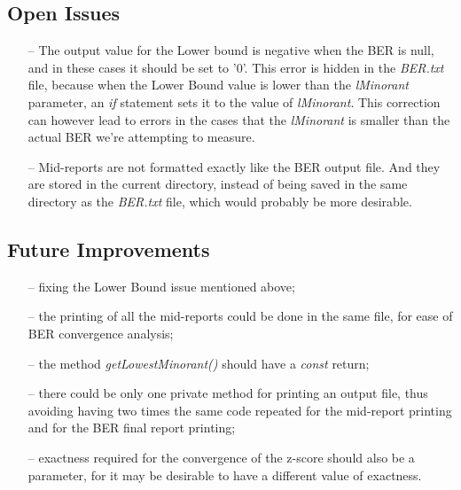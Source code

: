 \begin{refsection}
\subsection*{Open Issues}
\begin{itemize}
  \item[--] The output value for the Lower bound is negative when the BER is null, and in these cases it should be set to '0'. This error is hidden in the \textit{BER.txt} file, because when the Lower Bound value is lower than the \textit{lMinorant} parameter, an \textit{if} statement sets it to the value of \textit{lMinorant}. This correction can however lead to errors in the cases that the \textit{lMinorant} is smaller than the actual BER we're attempting to measure.

  \item[--] Mid-reports are not formatted exactly like the BER output file. And they are stored in the current directory, instead of being saved in the same directory as the \textit{BER.txt} file, which would probably be more desirable.
\end{itemize}

\subsection*{Future Improvements}
\begin{itemize}
    \item[--] fixing the Lower Bound issue mentioned above;
    \item[--] the printing of all the mid-reports could be done in the same file, for ease of BER convergence analysis;
    \item[--] the method \textit{getLowestMinorant()} should have a \textit{const} return;
    \item[--] there could be only one private method for printing an output file, thus avoiding having two times the same code repeated for the mid-report printing and for the BER final report printing;
    \item[--] exactness required for the convergence of the z-score should also be a parameter, for it may be desirable to have a different value of exactness.
\end{itemize}

\clearpage
\printbibliography[heading=subbibliography]
\end{refsection}
\cleardoublepage
